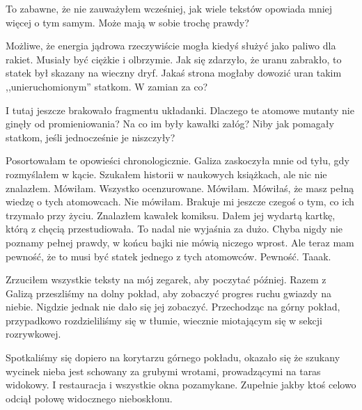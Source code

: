 To zabawne, że nie zauważyłem wcześniej, jak wiele tekstów  opowiada mniej więcej o tym samym. 
Może mają w sobie trochę prawdy?

Możliwe, że energia jądrowa rzeczywiście mogła kiedyś służyć jako paliwo dla rakiet. Musiały być ciężkie i olbrzymie.
Jak się zdarzyło, że uranu zabrakło, to statek był skazany na wieczny dryf.
Jakaś strona mogłaby dowozić uran takim ,,unieruchomionym'' statkom. W zamian za co?

I tutaj jeszcze brakowało fragmentu układanki. Dlaczego te atomowe mutanty nie ginęły od promieniowania? Na co im były kawałki załóg?
Niby jak pomagały statkom, jeśli jednocześnie je niszczyły?

\begin{dialogue}
	\ds{} Posortowałam te opowieści chronologicznie. \dm{} Galiza zaskoczyła mnie od tyłu, gdy rozmyślałem w kącie.
	\ds{} Szukałem historii w naukowych książkach, ale nic nie znalazłem.
	\ds{} Mówiłam.
	\ds{} Wszystko ocenzurowane.
	\ds{} Mówiłam.
	\ds{} Mówiłaś, że masz pełną wiedzę o tych atomowcach.
	\ds{} Nie mówiłam. Brakuje mi jeszcze czegoś o tym, co ich trzymało przy życiu.
	\ds{} Znalazłem kawałek komiksu. \dm{} Dałem jej wydartą kartkę, którą z chęcią przestudiowała.
	\ds{} To nadal nie wyjaśnia za dużo.
	\ds{} Chyba nigdy nie poznamy pełnej prawdy, w końcu bajki nie mówią niczego wprost.
	\ds{} Ale teraz mam pewność, że to musi być statek jednego z tych atomowców.
	\ds{} Pewność. Taaak.
\end{dialogue}

Zrzuciłem wszystkie teksty na mój zegarek, aby poczytać później.
Razem z Galizą przeszliśmy na dolny pokład, aby zobaczyć progres ruchu gwiazdy na niebie.
Nigdzie jednak nie dało się jej zobaczyć.
Przechodząc na górny pokład, przypadkowo rozdzieliliśmy się w tłumie, wiecznie miotającym się w sekcji rozrywkowej.

Spotkaliśmy się dopiero na korytarzu górnego pokładu, okazało się że szukany wycinek nieba jest schowany za grubymi wrotami, prowadzącymi na taras widokowy.
I restauracja i wszystkie okna pozamykane.
Zupełnie jakby ktoś celowo odciął połowę widocznego nieboskłonu.

